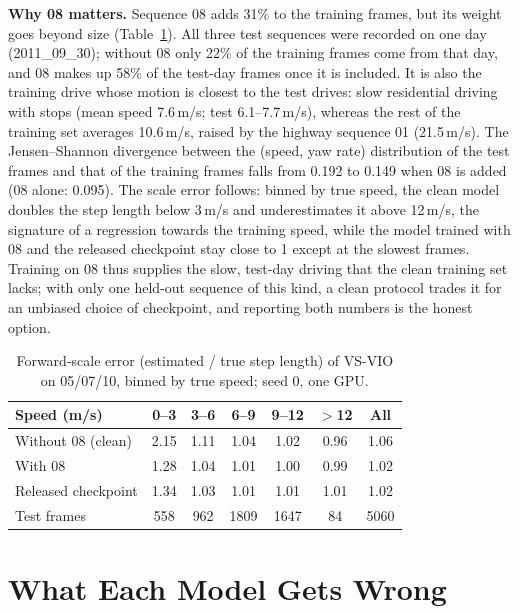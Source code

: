 \documentclass[letterpaper,journal]{IEEEtran}
\begin{document}
\textbf{Why 08 matters.} Sequence 08 adds 31\% to the training frames, but its weight goes beyond size (Table~\ref{tab:why08}). All three test sequences were recorded on one day (2011\_09\_30); without 08 only 22\% of the training frames come from that day, and 08 makes up 58\% of the test-day frames once it is included. It is also the training drive whose motion is closest to the test drives: slow residential driving with stops (mean speed 7.6\,m/s; test 6.1--7.7\,m/s), whereas the rest of the training set averages 10.6\,m/s, raised by the highway sequence 01 (21.5\,m/s). The Jensen--Shannon divergence between the (speed, yaw rate) distribution of the test frames and that of the training frames falls from 0.192 to 0.149 when 08 is added (08 alone: 0.095). The scale error follows: binned by true speed, the clean model doubles the step length below 3\,m/s and underestimates it above 12\,m/s, the signature of a regression towards the training speed, while the model trained with 08 and the released checkpoint stay close to 1 except at the slowest frames. Training on 08 thus supplies the slow, test-day driving that the clean training set lacks; with only one held-out sequence of this kind, a clean protocol trades it for an unbiased choice of checkpoint, and reporting both numbers is the honest option.

\begin{table}[t]
\centering
\caption{Forward-scale error (estimated / true step length) of VS-VIO on 05/07/10, binned by true speed; seed 0, one GPU.}
\label{tab:why08}
\setlength{\tabcolsep}{2.2pt}
\begin{tabular}{@{}lcccccc@{}}
\toprule
Speed (m/s) & 0--3 & 3--6 & 6--9 & 9--12 & $>$12 & All \\
\midrule
Without 08 (clean) & 2.15 & 1.11 & 1.04 & 1.02 & 0.96 & 1.06 \\
With 08 & 1.28 & 1.04 & 1.01 & 1.00 & 0.99 & 1.02 \\
Released checkpoint & 1.34 & 1.03 & 1.01 & 1.01 & 1.01 & 1.02 \\
\midrule
Test frames & 558 & 962 & 1809 & 1647 & 84 & 5060 \\
\bottomrule
\end{tabular}
\end{table}

\section{What Each Model Gets Wrong}
\label{sec:diag}
\end{document}
